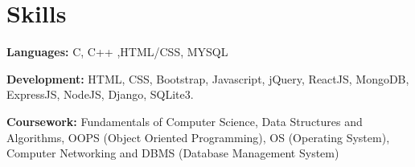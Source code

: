 \documentclass[letterpaper,11pt]{article}
\newcommand{\resumeSubHeadingListStart}{\begin{itemize}[leftmargin=0.15in, label={}]}
\newcommand{\resumeSubHeadingListEnd}{\end{itemize}}
\begin{document}
\section{Skills}
  \vspace{2pt}
  \resumeSubHeadingListStart
    \small{\item{

  
    \textbf{Languages:}{ C, C++ ,HTML/CSS, MYSQL} \ \vspace{3pt}

    \textbf{Development:}{ HTML, CSS, Bootstrap, Javascript, jQuery, ReactJS, MongoDB, ExpressJS, NodeJS, Django, SQLite3.
} \ \vspace{3pt}

    \textbf{Coursework:}{ Fundamentals of Computer Science, Data Structures and Algorithms, OOPS (Object Oriented
Programming), OS (Operating System), Computer Networking and DBMS (Database Management System)
} \ \vspace{3pt}

}}
\resumeSubHeadingListEnd


\end{document}
